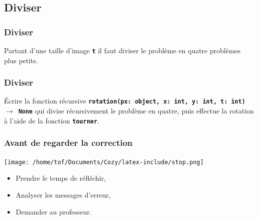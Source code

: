 \documentclass[svgnames,11pt]{beamer}
\begin{document}
\subsection{Diviser}
\begin{frame}
    \frametitle{Diviser}
    Partant d'une taille d'image \textbf{\texttt{t}} il faut diviser le problème en quatre problèmes plus petits.
    \begin{center}
    \end{center}

\end{frame}
\begin{frame}
    \frametitle{Diviser}
    \begin{center}
    \end{center}
    \begin{activite}
        Écrire la fonction récursive \textbf{\texttt{rotation(px: object, x: int, y: int, t: int) $\rightarrow$ None}} qui divise récursivement le problème en quatre, puis effectue la rotation à l'aide de la fonction \textbf{\texttt{tourner}}.
    \end{activite}
\end{frame}
\begin{frame}
    \frametitle{Avant de regarder la correction}
    \begin{center}
        \centering
        \texttt{[image: /home/tof/Documents/Cozy/latex-include/stop.png]}
    \end{center}
    {\Large
    \begin{itemize}
        \item Prendre le temps de réfléchir,
        \item Analyser les messages d'erreur,
        \item Demander au professeur.
    \end{itemize}
    }
\end{frame}
\end{document}
